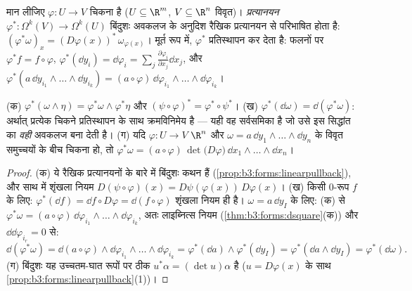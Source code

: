 \begin{definition}[प्रत्यानयन]\label{def:b3:forms:pullback}
मान लीजिए $\varphi\colon U \to V$ चिकना है ($U \subseteq \R^m$, $V \subseteq \R^n$ विवृत)।
\emph{प्रत्यानयन} $\varphi^*\colon \Omega^k(V) \to \Omega^k(U)$ बिंदुशः अवकलज के
अनुदिश रैखिक प्रत्यानयन से परिभाषित होता है: $(\varphi^*\omega)_x = (D\varphi(x))^*\,\omega_{\varphi(x)}$। मूर्त रूप
में, $\varphi^*$ प्रतिस्थापन कर देता है: फलनों पर $\varphi^*f = f \circ
\varphi$, $\varphi^*(\dd y_i) =
\dd\varphi_i = \sum_j\frac{\partial\varphi_i}{\partial
x_j}\dd x_j$, और
$\varphi^*(a\,\dd y_{i_1}\wedge\dots\wedge
\dd y_{i_k}) =
(a\circ\varphi)\,\dd\varphi_{i_1}\wedge\dots\wedge
\dd\varphi_{i_k}$।
\end{definition}

\begin{theorem}\label{thm:b3:forms:pullback}
(क) $\varphi^*(\omega \wedge \eta) = \varphi^*\omega \wedge
\varphi^*\eta$ और $(\psi \circ \varphi)^* = \varphi^* \circ
\psi^*$।
(ख) $\varphi^*(\dd\omega) = \dd(\varphi^*\omega)$: अर्थात्  प्रत्येक चिकने प्रतिस्थापन के साथ
क्रमविनिमेय है --- यही वह सर्वसमिका है जो उसे इस सिद्धांत का
\emph{वही} अवकलज बना देती है।
(ग) यदि $\varphi\colon U \to V$ $\R^n$ और $\omega = a\,\dd y_1 \wedge \dots \wedge \dd
y_n$ के विवृत समुच्चयों के बीच चिकना हो,
तो $\varphi^*\omega = (a \circ
\varphi)\,\det\bigl(D\varphi\bigr)\,\dd x_1 \wedge \dots
\wedge \dd x_n$।
\end{theorem}

\begin{proof}
(क) ये रैखिक प्रत्यानयनों के बारे में बिंदुशः कथन हैं (\cref{prop:b3:forms:linearpullback}), और
साथ में शृंखला नियम $D(\psi\circ\varphi)(x) = D\psi(\varphi(x))\,D\varphi(x)$।
(ख) किसी $0$-रूप $f$ के लिए: $\varphi^*(\dd f) = \dd f \circ
D\varphi = \dd(f \circ \varphi)$ शृंखला नियम ही है। $\omega = a\,\dd y_I$
के लिए: (क) से $\varphi^*\omega =
(a\circ\varphi)\,\dd\varphi_{i_1}\wedge\dots\wedge
\dd\varphi_{i_k}$, अतः लाइब्नित्स नियम (\cref{thm:b3:forms:dsquare}(क)) और $\dd\dd\varphi_{i_r} =
0$ से:
\[
\dd(\varphi^*\omega) = \dd(a\circ\varphi) \wedge
\dd\varphi_{i_1}\wedge\dots\wedge\dd\varphi_{i_k}
= \varphi^*(\dd a) \wedge \varphi^*(\dd y_I)
= \varphi^*(\dd a \wedge \dd y_I) =
\varphi^*(\dd\omega).
\]
(ग) बिंदुशः यह उच्चतम-घात रूपों पर ठीक $u^*\alpha = (\det u)\alpha$ है ($u = D\varphi(x)$ के साथ
\cref{prop:b3:forms:linearpullback}(1))।
\end{proof}

